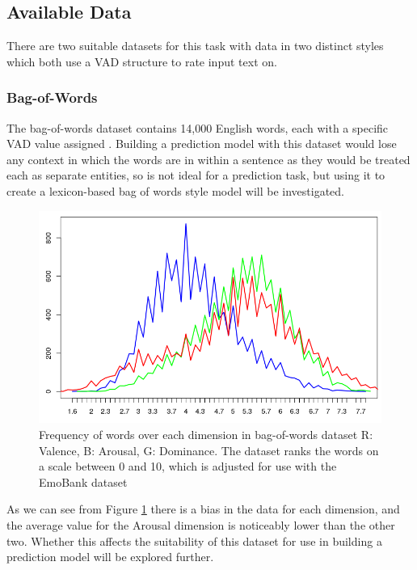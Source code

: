 \subsection{Available Data}
There are two suitable datasets for this task with data in two distinct styles which both use a VAD structure to rate input text on.

\subsubsection{Bag-of-Words}

The bag-of-words dataset contains 14,000 English words, each with a specific VAD value assigned \cite{wordsData}. Building a prediction model with this dataset would lose any context in which the words are in within a sentence as they would be treated each as separate entities, so is not ideal for a prediction task, but using it to create a lexicon-based bag of words style model will be investigated.

\begin{figure}[h]
\centering
\includegraphics[scale=0.4]{graphs/lexiconDist.png}
\caption{Frequency of words over each dimension in bag-of-words dataset R: Valence, B: Arousal, G: Dominance. The dataset ranks the words on a scale between 0 and 10, which is adjusted for use with the EmoBank dataset}
\label{lexiconGraph}
\end{figure}

As we can see from Figure \ref{lexiconGraph} there is a bias in the data for each dimension, and the average value for the Arousal dimension is noticeably lower than the other two. Whether this affects the suitability of this dataset for use in building a prediction model will be explored further.

